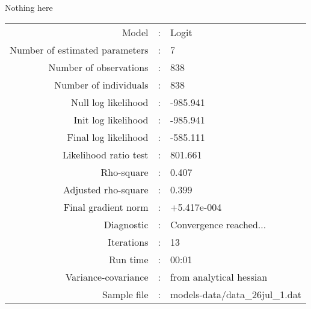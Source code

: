 Nothing here\\


\begin{flushleft}
\begin{tabular}{rcl}
\hline
Model &:& Logit\\
Number of estimated parameters&:&7\\
Number of  observations &:& 838\\
Number of individuals&:&838\\
Null log likelihood&:&-985.941\\
Init log likelihood&:&-985.941\\
Final log likelihood&:&-585.111\\
Likelihood ratio test &:&801.661\\
Rho-square&:&0.407\\
Adjusted rho-square&:&0.399\\
Final gradient norm&:&+5.417e-004\\
Diagnostic&:&Convergence reached...\\
Iterations&:&13\\
Run time&:&00:01\\
Variance-covariance&:&from analytical hessian
\\
Sample file&:&models-data/data_26jul_1.dat\\
\end{tabular}
\end{flushleft}
